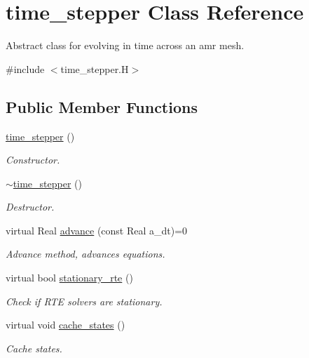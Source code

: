 \hypertarget{classtime__stepper}{}\section{time\+\_\+stepper Class Reference}
\label{classtime__stepper}


Abstract class for evolving in time across an amr mesh.  




{\ttfamily \#include $<$time\+\_\+stepper.\+H$>$}

\subsection*{Public Member Functions}
\begin{DoxyCompactItemize}
\item 
\hyperlink{classtime__stepper_a3a1387578d5b160e001705939c315788}{time\+\_\+stepper} ()
\begin{DoxyCompactList}\small\item\em Constructor. \end{DoxyCompactList}\item 
\hyperlink{classtime__stepper_a05c1e1fa8670b4e2eacc842e258ab75e}{$\sim$time\+\_\+stepper} ()
\begin{DoxyCompactList}\small\item\em Destructor. \end{DoxyCompactList}\item 
virtual Real \hyperlink{classtime__stepper_a278c88ce2e4d14be574357ce6b586187}{advance} (const Real a\+\_\+dt)=0
\begin{DoxyCompactList}\small\item\em Advance method, advances equations. \end{DoxyCompactList}\item 
virtual bool \hyperlink{classtime__stepper_ade56248667134c40f3299b850621e7ad}{stationary\+\_\+rte} ()
\begin{DoxyCompactList}\small\item\em Check if R\+TE solvers are stationary. \end{DoxyCompactList}\item 
virtual void \hyperlink{classtime__stepper_a8b2cd650662608bb02fc4179c7ecbeed}{cache\+\_\+states} ()
\begin{DoxyCompactList}\small\item\em Cache states. \end{DoxyCompactList}\item 

\end{DoxyCompactItemize}
